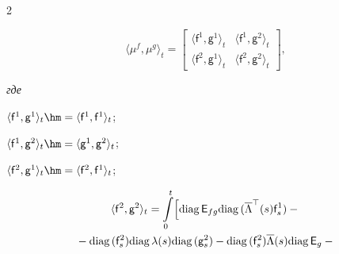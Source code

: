 \begin{multicols}{2}
\pagebreak





\noindent


$$


\langle  \mu^f,\mu^g\rangle_t= \left[


\begin{array}{cc}


\langle \mathsf{f}^1, \mathsf{g}^1 \rangle_t & \langle \mathsf{f}^1, 


\mathsf{g}^2 \rangle_t \\


\langle \mathsf{f}^2, \mathsf{g}^1 \rangle_t & \langle \mathsf{f}^2, 


\mathsf{g}^2 \rangle_t


\end{array}


\right],


$$ 


\textit{где}


$\langle \mathsf{f}^1, \mathsf{g}^1 \rangle_t\hm = \langle \mathsf{f}^1, \mathsf{f}^1 \rangle_t$;


$\langle \mathsf{f}^1, \mathsf{g}^2 \rangle_t\hm = \langle \mathsf{g}^1, 


\mathsf{g}^2 \rangle_t$;


$\langle \mathsf{f}^2, \mathsf{g}^1 \rangle_t \hm= \langle \mathsf{f}^2, \mathsf{f}^1 \rangle_t$;





\vspace*{-6pt}





\noindent


\begin{multline}


\langle \mathsf{f}^2, \mathsf{g}^2 \rangle_t=


\int\limits_0^t\Bigl[


\mathrm{diag}\,{\mathsf E}_{fg}\mathrm{diag}\, ( \overline{\Lambda}^{\top}(s)\mathsf{f}^1_s) - {}\\


{}- \mathrm{diag}\,(\mathsf{f}^2_s) 


\mathrm{diag}\,\lambda(s)  \mathrm{diag}\, (\mathsf{g}^2_s)


-  \mathrm{diag}\,(\mathsf{f}^2_s) \overline{\Lambda}(s)\mathrm{diag}\,{\mathsf E}_g - {}\\



\end{multline}
\end{multicols}
